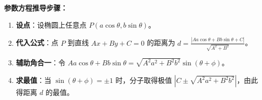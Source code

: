 \begin{proofbox}
\textbf{参数方程推导步骤：}
\begin{enumerate}
    \item \textbf{设点}：设椭圆上任意点 $P(a\cos\theta, b\sin\theta)$。
    \item \textbf{代入公式}：点 $P$ 到直线 $Ax + By + C = 0$ 的距离为 $d = \frac{|Aa\cos\theta + Bb\sin\theta + C|}{\sqrt{A^2 + B^2}}$。
    \item \textbf{辅助角合一}：令 $Aa\cos\theta + Bb\sin\theta = \sqrt{A^2a^2 + B^2b^2}\sin(\theta + \phi)$。
    \item \textbf{求最值}：当 $\sin(\theta + \phi) = \pm 1$ 时，分子取得极值 $|C \pm \sqrt{A^2a^2 + B^2b^2}|$，由此得距离 $d$ 的最值。
\end{enumerate}
\end{proofbox}